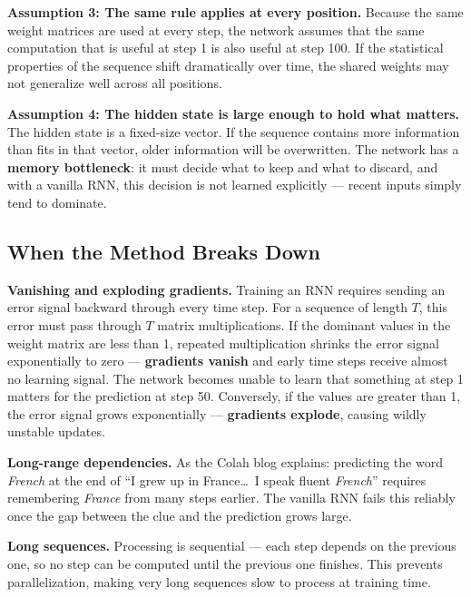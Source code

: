 \textbf{Assumption 3: The same rule applies at every position.}
Because the same weight matrices are used at every step, the network assumes that the
same computation that is useful at step 1 is also useful at step 100. If the
statistical properties of the sequence shift dramatically over time, the shared weights
may not generalize well across all positions.

\textbf{Assumption 4: The hidden state is large enough to hold what matters.}
The hidden state is a fixed-size vector. If the sequence contains more information than
fits in that vector, older information will be overwritten. The network has a
\textbf{memory bottleneck}: it must decide what to keep and what to discard, and with
a vanilla RNN, this decision is not learned explicitly --- recent inputs simply tend to
dominate.

\subsection{When the Method Breaks Down}

\textbf{Vanishing and exploding gradients.}
Training an RNN requires sending an error signal backward through every time step.
For a sequence of length $T$, this error must pass through $T$ matrix multiplications.
If the dominant values in the weight matrix are less than 1, repeated multiplication
shrinks the error signal exponentially to zero --- \textbf{gradients vanish} and early
time steps receive almost no learning signal. The network becomes unable to learn that
something at step 1 matters for the prediction at step 50. Conversely, if the values
are greater than 1, the error signal grows exponentially --- \textbf{gradients explode},
causing wildly unstable updates.

\textbf{Long-range dependencies.}
As the Colah blog explains: predicting the word \textit{French} at the end of ``I grew
up in France\ldots\ I speak fluent \textit{French}'' requires remembering
\textit{France} from many steps earlier. The vanilla RNN fails this reliably once the
gap between the clue and the prediction grows large.

\textbf{Long sequences.}
Processing is sequential --- each step depends on the previous one, so no step can be
computed until the previous one finishes. This prevents parallelization, making very
long sequences slow to process at training time.

